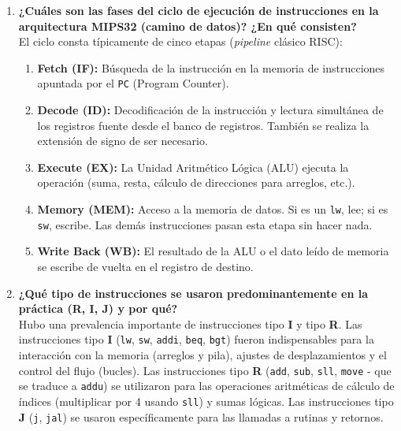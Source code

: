 \documentclass[12pt,letterpaper]{article}
\begin{document}
\begin{enumerate}[label=\textbf{\arabic*.}, leftmargin=*]
    \item \textbf{¿Cuáles son las fases del ciclo de ejecución de instrucciones en la arquitectura MIPS32 (camino de datos)? ¿En qué consisten?} \\
    El ciclo consta típicamente de cinco etapas (\textit{pipeline} clásico RISC):
    \begin{enumerate}
        \item \textbf{Fetch (IF):} Búsqueda de la instrucción en la memoria de instrucciones apuntada por el \texttt{PC} (Program Counter).
        \item \textbf{Decode (ID):} Decodificación de la instrucción y lectura simultánea de los registros fuente desde el banco de registros. También se realiza la extensión de signo de ser necesario.
        \item \textbf{Execute (EX):} La Unidad Aritmético Lógica (ALU) ejecuta la operación (suma, resta, cálculo de direcciones para arreglos, etc.).
        \item \textbf{Memory (MEM):} Acceso a la memoria de datos. Si es un \texttt{lw}, lee; si es \texttt{sw}, escribe. Las demás instrucciones pasan esta etapa sin hacer nada.
        \item \textbf{Write Back (WB):} El resultado de la ALU o el dato leído de memoria se escribe de vuelta en el registro de destino.
    \end{enumerate}

    \item \textbf{¿Qué tipo de instrucciones se usaron predominantemente en la práctica (R, I, J) y por qué?} \\
    Hubo una prevalencia importante de instrucciones tipo \textbf{I} y tipo \textbf{R}. Las instrucciones tipo \textbf{I} (\texttt{lw}, \texttt{sw}, \texttt{addi}, \texttt{beq}, \texttt{bgt}) fueron indispensables para la interacción con la memoria (arreglos y pila), ajustes de desplazamientos y el control del flujo (bucles). Las instrucciones tipo \textbf{R} (\texttt{add}, \texttt{sub}, \texttt{sll}, \texttt{move} - que se traduce a \texttt{addu}) se utilizaron para las operaciones aritméticas de cálculo de índices (multiplicar por 4 usando \texttt{sll}) y sumas lógicas. Las instrucciones tipo \textbf{J} (\texttt{j}, \texttt{jal}) se usaron específicamente para las llamadas a rutinas y retornos.


\end{enumerate}
\end{document}
